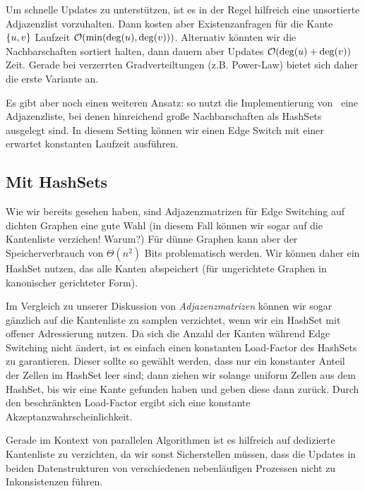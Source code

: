 Um schnelle Updates zu unterstützen, ist es in der Regel hilfreich eine unsortierte Adjazenzlist vorzuhalten.
Dann kosten aber Existenzanfragen für die Kante $\left\{u,v\right\}$ Laufzeit $\mathcal{O}\!\left(\min(\deg(u), \deg(v))\right)$.
Alternativ könnten wir die Nachbarschaften sortiert halten, dann dauern aber Updates $\mathcal{O}\!\left(\deg(u) + \deg(v)\right)$ Zeit.
Gerade bei verzerrten Gradverteiltungen (z.B. Power-Law) bietet sich daher die erste Variante an.

Es gibt aber noch einen weiteren Ansatz: so nutzt die Implementierung von~\cite{DBLP:journals/compnet/VigerL16} eine Adjazenzliste, bei denen hinreichend große Nachbarschaften als HashSets ausgelegt sind.
In diesem Setting können wir einen Edge Switch mit einer erwartet konstanten Laufzeit ausführen.

\subsection{Mit HashSets}
Wie wir bereits gesehen haben, sind Adjazenzmatrizen für Edge Switching auf dichten Graphen eine gute Wahl (in diesem Fall können wir sogar auf die Kantenliste verzichen! Warum?)
Für dünne Graphen kann aber der Speicherverbrauch von $\Theta(n^2)$ Bits problematisch werden.
Wir können daher ein HashSet nutzen, das alle Kanten abspeichert (für ungerichtete Graphen in kanonischer gerichteter Form).

Im Vergleich zu unserer Diskussion von \emph{Adjazenzmatrizen} können wir sogar gänzlich auf die Kantenliste zu samplen verzichtet, wenn wir ein HashSet mit offener Adressierung nutzen.
Da sich die Anzahl der Kanten während Edge Switching nicht ändert, ist es einfach einen konstanten Load-Factor des HashSets zu garantieren.
Dieser sollte so gewählt werden, dass nur ein konstanter Anteil der Zellen im HashSet leer sind;
dann ziehen wir solange uniform Zellen aus dem HashSet, bis wir eine Kante gefunden haben und geben diese dann zurück.
Durch den beschränkten Load-Factor ergibt sich eine konstante Akzeptanzwahrscheinlichkeit.

Gerade im Kontext von parallelen Algorithmen ist es hilfreich auf dedizierte Kantenliste zu verzichten, da wir sonst Sicherstellen müssen, dass die Updates in beiden Datenstrukturen von verschiedenen nebenläufigen Prozessen nicht zu Inkonsistenzen führen.



